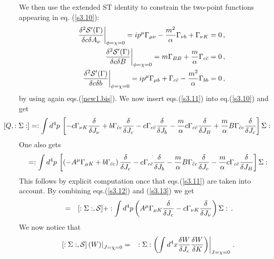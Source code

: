 \documentclass[a4paper,11pt]{article}
\def\G{\Gamma}
\begin{document}
We then use the extended ST identity to constrain the two-point
functions appearing in eq. (\ref{s3.10}):
%
\begin{eqnarray}
&& \left . {\delta ^2 {\cal S}'(\G) \over \delta c \delta A_\nu} 
\right |_{\phi=\chi=0} =
i p^\mu \G_{\mu\nu} - {m^2 \over \alpha} \G_{\nu b} 
+ \G_{\nu K} = 0 \, , \nonumber \\
&&  \left . {\delta ^2 {\cal S}'(\G) \over \delta c \delta B} 
\right |_{\phi=\chi=0} = m \G_{BB} + {m \over \alpha} \G_{c \bar c} = 0 \, ,
\nonumber \\
&&  \left . {\delta ^2 {\cal S}'(\G) \over \delta c \delta b} 
\right |_{\phi=\chi=0} =
i p^\mu \G_{\mu b} + \G_{c \bar c} - {m^2 \over \alpha} \G_{bb} = 0 \, ,
\label{s3.11}
\end{eqnarray}
% 
by using again eqs.(\ref{new1.bis}).
We now insert eqs.(\ref{s3.11}) into eq.(\ref{s3.10})
and get
%
\begin{eqnarray}
\hspace{-14mm} && [Q, :\Sigma:]  =  
: \int d^4p \, \left [ 
-c \G_{\nu K} {\delta \over \delta J_\nu} + 
b \G_{\bar c c} {\delta \over \delta J_c}
 - c \G_{c \bar c} {\delta \over \delta J_b}
- {m \over \alpha}c \G_{c \bar c} {\delta \over \delta J_B} 
+ {m \over \alpha} B \G_{\bar c c} {\delta \over \delta J_c}
\right ] \Sigma :
\label{s3.12}
\end{eqnarray}
%
One also gets
%
\begin{eqnarray}
[: \Sigma :, {\cal S}] = 
: \int d^4p \, \left [ 
\left ( -A^\mu \G_{\mu K}  + 
b \G_{\bar c c} \right ) {\delta \over \delta J_c}
 - c \G_{c \bar c} {\delta \over \delta J_b}
-{m \over \alpha} B \G_{\bar c c} {\delta \over \delta J_c}
-{m \over \alpha} c \G_{c \bar c} {\delta \over \delta J_B}
\right ] \Sigma :
\label{s3.13}
\end{eqnarray}
%
This follows by explicit computation once that eqs.(\ref{s3.11}) 
are taken into account.
%
By combining eqs.(\ref{s3.12}) and (\ref{s3.13}) we 
get
%
\begin{eqnarray}
[Q , : \Sigma: ] & = & [: \Sigma :, {\cal S} ] 
+ : \int d^4p \left ( A^\mu \G_{\mu K} {\delta \over \delta J_c} 
-c \G_{\nu K} {\delta \over \delta J_\nu}
\right ) \Sigma : \, . 
\label{s3.14}
\end{eqnarray}
%
%
We now notice that
%
\begin{eqnarray}
\left . \left [ : \Sigma :, {\cal S} \right ] (W) \right |_{J=\chi=0} & = &
\left . : \Sigma : \left ( \int d^4x {\delta W \over \delta J_c} {\delta W \over \delta K} \right )
\right |_{J=\chi=0} \, .
\label{s3.7}
\end{eqnarray}
\end{document}
